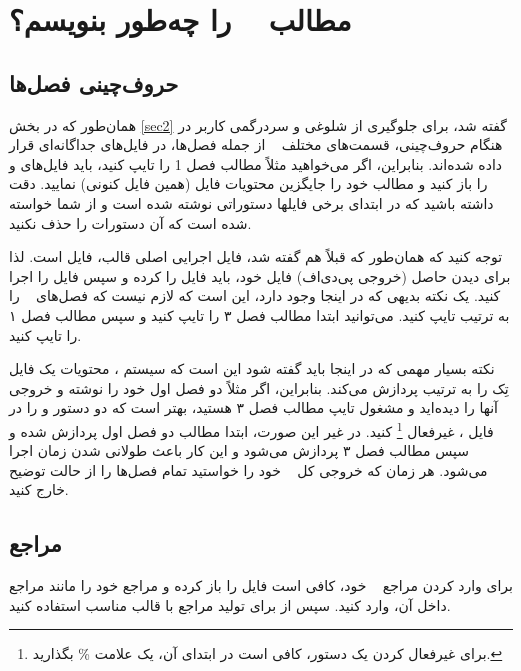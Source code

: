  \section[مطالب پروژه را چطور بنویسم؟]
 {مطالب \پ ~ را چه‌طور بنویسم؟}
 
 \subsection{حروف‌چینی فصل‌ها}
 همان‌طور که در بخش \ref{sec2} گفته شد، برای جلوگیری از شلوغی و سردرگمی کاربر در هنگام حروف‌چینی، قسمت‌های مختلف \پ~ از جمله فصل‌ها، در فایل‌های جداگانه‌ای قرار داده شده‌اند. 
 بنابراین، اگر می‌خواهید مثلاً مطالب فصل 1 را تایپ کنید، باید فایل‌های 
 و
 را باز کنید و مطالب خود را جایگزین محتویات فایل 
(همین فایل کنونی) نمایید. دقت داشته باشید که در ابتدای برخی فایلها دستوراتی نوشته شده است و از شما خواسته شده است که آن دستورات را حذف نکنید.
\par
 توجه کنید که همان‌طور که قبلاً هم گفته شد، فایل اجرایی اصلی قالب، فایل 
 است. لذا برای دیدن حاصل (خروجی پی‌دی‌اف) فایل خود، باید فایل  
 را 
 کرده و سپس فایل 
 را اجرا کنید. یک نکته بدیهی که در اینجا وجود دارد، این است که لازم نیست که فصل‌های \پ~ را به ترتیب تایپ کنید. می‌توانید ابتدا مطالب فصل ۳ را تایپ کنید و سپس مطالب فصل ۱ را تایپ کنید. 
 
 نکته بسیار مهمی که در اینجا باید گفته شود این است که سیستم 
 \lr{\TeX}، 
 محتویات یک فایل تِک را به ترتیب پردازش می‌کند.  بنابراین، اگر مثلاً  دو فصل اول خود را نوشته و خروجی آنها را دیده‌اید و مشغول تایپ مطالب فصل ۳ هستید، بهتر است
 که دو دستور 
 \verb!!
 و
 \verb!!
 را در فایل 
 ،
 غیرفعال%
 \footnote{
     برای غیرفعال کردن یک دستور، کافی است در ابتدای آن، یک علامت
     \%
     بگذارید.
 }
 کنید. 
 در غیر این صورت، ابتدا مطالب دو فصل اول  پردازش شده و سپس مطالب فصل ۳ پردازش می‌شود و این کار باعث طولانی شدن زمان اجرا می‌شود. هر زمان که خروجی کل \پ~ خود را خواستید تمام فصل‌ها را از حالت توضیح خارج کنید.
 
 \subsection{مراجع}
 برای وارد کردن مراجع \پ~ خود، کافی است فایل 
 را باز کرده و مراجع خود را مانند مراجع داخل آن، وارد کنید. سپس از
 برای تولید مراجع با قالب مناسب استفاده کنید.  
 
